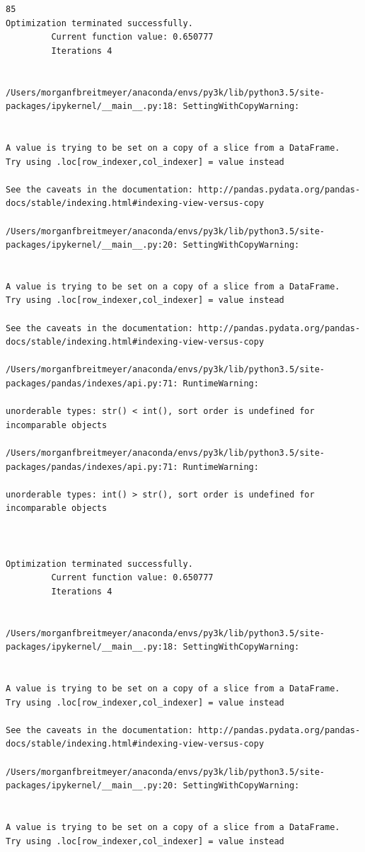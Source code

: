 \begin{lstlisting}
85
Optimization terminated successfully.
         Current function value: 0.650777
         Iterations 4


/Users/morganfbreitmeyer/anaconda/envs/py3k/lib/python3.5/site-packages/ipykernel/__main__.py:18: SettingWithCopyWarning:


A value is trying to be set on a copy of a slice from a DataFrame.
Try using .loc[row_indexer,col_indexer] = value instead

See the caveats in the documentation: http://pandas.pydata.org/pandas-docs/stable/indexing.html#indexing-view-versus-copy

/Users/morganfbreitmeyer/anaconda/envs/py3k/lib/python3.5/site-packages/ipykernel/__main__.py:20: SettingWithCopyWarning:


A value is trying to be set on a copy of a slice from a DataFrame.
Try using .loc[row_indexer,col_indexer] = value instead

See the caveats in the documentation: http://pandas.pydata.org/pandas-docs/stable/indexing.html#indexing-view-versus-copy

/Users/morganfbreitmeyer/anaconda/envs/py3k/lib/python3.5/site-packages/pandas/indexes/api.py:71: RuntimeWarning:

unorderable types: str() < int(), sort order is undefined for incomparable objects

/Users/morganfbreitmeyer/anaconda/envs/py3k/lib/python3.5/site-packages/pandas/indexes/api.py:71: RuntimeWarning:

unorderable types: int() > str(), sort order is undefined for incomparable objects



Optimization terminated successfully.
         Current function value: 0.650777
         Iterations 4


/Users/morganfbreitmeyer/anaconda/envs/py3k/lib/python3.5/site-packages/ipykernel/__main__.py:18: SettingWithCopyWarning:


A value is trying to be set on a copy of a slice from a DataFrame.
Try using .loc[row_indexer,col_indexer] = value instead

See the caveats in the documentation: http://pandas.pydata.org/pandas-docs/stable/indexing.html#indexing-view-versus-copy

/Users/morganfbreitmeyer/anaconda/envs/py3k/lib/python3.5/site-packages/ipykernel/__main__.py:20: SettingWithCopyWarning:


A value is trying to be set on a copy of a slice from a DataFrame.
Try using .loc[row_indexer,col_indexer] = value instead


\end{lstlisting}
